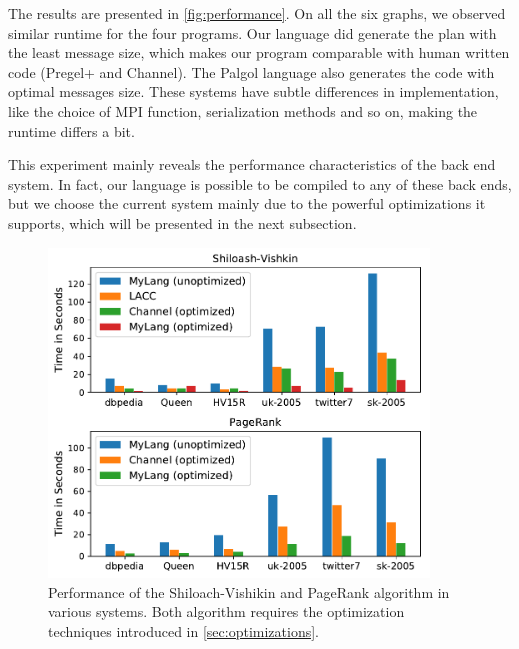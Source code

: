 \documentclass{sokendai_thesis} %
\begin{document}
The results are presented in \autoref{fig:performance}.
On all the six graphs, we observed similar runtime for the four programs.
Our language did generate the plan with the least message size, which makes our program comparable with human written code (Pregel+ and Channel).
The Palgol language also generates the code with optimal messages size.
These systems have subtle differences in implementation, like the choice of MPI function, serialization methods and so on, making the runtime differs a bit.

This experiment mainly reveals the performance characteristics of the back end system.
In fact, our language is possible to be compiled to any of these back ends, but we choose the current system mainly due to the powerful optimizations it supports, which will be presented in the next subsection.

\begin{figure}
\centering
\includegraphics[width=0.9\textwidth]{figures/both.pdf}
\caption{Performance of the Shiloach-Vishikin and PageRank algorithm in various systems. Both algorithm requires the optimization techniques introduced in \autoref{sec:optimizations}. }
\label{fig:sv-results}
\end{figure}
\end{document}
